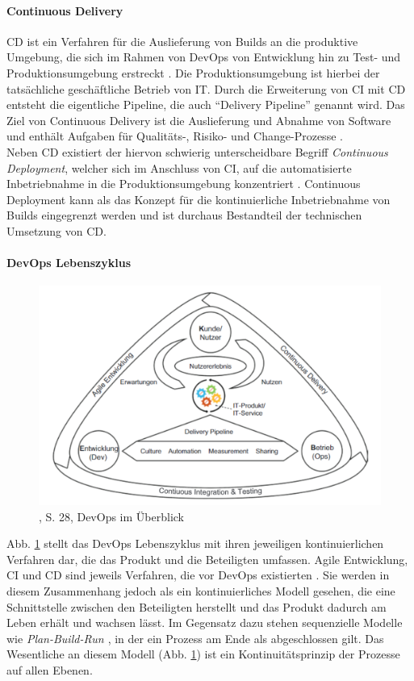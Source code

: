\paragraph{Continuous Delivery}
\ac{CD} ist ein Verfahren für die Auslieferung von Builds an die produktive Umgebung, die sich im Rahmen von DevOps von Entwicklung hin zu Test- und Produktionsumgebung erstreckt \citet{Alt2017}. Die Produktionsumgebung ist hierbei der tatsächliche geschäftliche Betrieb von IT. Durch die Erweiterung von \ac{CI} mit \ac{CD} entsteht die eigentliche Pipeline, die auch \enquote{Delivery Pipeline} genannt wird. Das Ziel von Continuous Delivery ist die Auslieferung und Abnahme von Software und enthält Aufgaben für Qualitäts-, Risiko- und Change-Prozesse \cite{Alt2017}.
\medskip
\\
Neben \ac{CD} existiert der hiervon schwierig unterscheidbare Begriff \emph{Continuous Deployment}, welcher sich im Anschluss von \ac{CI}, auf die automatisierte Inbetriebnahme in die Produktionsumgebung konzentriert \cite{Alt2017}. Continuous Deployment kann als das Konzept für die kontinuierliche Inbetriebnahme von Builds eingegrenzt werden und ist durchaus Bestandteil der technischen Umsetzung von \ac{CD}.
%
\paragraph{DevOps Lebenszyklus}
\begin{figure}[htbp]
 \centering
 \includegraphics[width=1.0\textwidth]{gfx/devops_ueberblick.PNG}
 \caption{\citet{Alt2017}, S. 28, DevOps im Überblick\label{fig:devops}}
\end{figure}
\medskip
Abb. \ref{fig:devops} stellt das DevOps Lebenszyklus mit ihren jeweiligen kontinuierlichen Verfahren dar, die das Produkt und die Beteiligten umfassen. Agile Entwicklung, \ac{CI} und \ac{CD} sind jeweils Verfahren, die vor DevOps existierten \cite{Alt2017}. Sie werden in diesem Zusammenhang jedoch als ein kontinuierliches Modell gesehen, die eine Schnittstelle zwischen den Beteiligten herstellt und das Produkt dadurch am Leben erhält und wachsen lässt. Im Gegensatz dazu stehen sequenzielle Modelle wie \emph{Plan-Build-Run \cite{Koch2016}}, in der ein Prozess am Ende als abgeschlossen gilt. Das Wesentliche an diesem Modell (Abb. \ref{fig:devops}) ist ein Kontinuitätsprinzip \cite{Alt2017} der Prozesse auf allen Ebenen.


